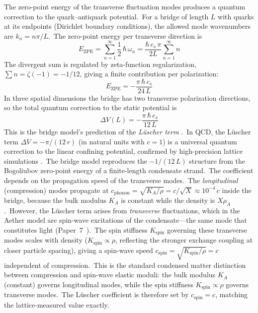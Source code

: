 ﻿\documentclass[12pt,letterpaper]{article}
\newcommand{\rhoa}{\rho_{\!A}}
\newcommand{\Ka}{K_{\!A}}
\begin{document}
The zero-point energy of the transverse fluctuation modes
produces a quantum correction to the quark--antiquark potential.\ For a
bridge of length $L$ with quarks at its endpoints (Dirichlet boundary
conditions), the allowed mode wavenumbers are
$k_n = n\pi / L$.\ The zero-point energy per transverse direction is
%
\begin{equation}
  E_{\mathrm{ZPE}} = \sum_{n=1}^{\infty} \frac{1}{2}\,\hbar\,\omega_n
    = \frac{\hbar\,c_s\,\pi}{2L} \sum_{n=1}^{\infty} n
\end{equation}
%
The divergent sum is regulated by zeta-function regularization,
$\sum n = \zeta(-1) = -1/12$, giving a finite contribution per
polarization:
%
\begin{equation}
  E_{\mathrm{ZPE}} = -\frac{\pi\,\hbar\,c_s}{24\,L}
\end{equation}
%
In three spatial dimensions the bridge has two transverse polarization
directions, so the total quantum correction to the static potential is
%
\begin{equation}
  \label{eq:luscher}
  \Delta V(L) = -\frac{\pi\,\hbar\,c_s}{12\,L}
\end{equation}
%
This is the bridge model's prediction of the \emph{L\"uscher term}
\cite{luscher1981,luscher2002}.\ In QCD, the L\"uscher term
$\Delta V = -\pi/(12\,r)$ (in natural units with $c = 1$) is a universal
quantum correction to the linear confining potential, confirmed by
high-precision lattice simulations \cite{juge2004}.\ The bridge model
reproduces the $-1/(12\,L)$ structure from the Bogoliubov
zero-point energy of a finite-length condensate strand.\ The coefficient
depends on the propagation speed of the transverse modes.\ The
\emph{longitudinal} (compression) modes propagate at
$c_{\mathrm{phonon}} = \sqrt{\Ka/\rho} = c/\sqrt{X} \approx 10^{-4}\,c$
inside the bridge, because the bulk modulus $\Ka$ is constant while the
density is $X\rhoa$.\ However, the L\"uscher term arises from
\emph{transverse} fluctuations, which in the Aether model are spin-wave
excitations of the condensate---the same mode that constitutes light
(Paper~7~\cite{otto-quantum}).\ The spin stiffness $K_{\mathrm{spin}}$
governing these transverse modes scales with density ($K_{\mathrm{spin}}
\propto \rho$, reflecting the stronger exchange coupling at closer
particle spacing), giving a spin-wave speed
$c_{\mathrm{spin}} = \sqrt{K_{\mathrm{spin}}/\rho} = c$ independent of
compression.\ This is the standard condensed matter distinction between
compression and spin-wave elastic moduli: the bulk modulus $\Ka$ (constant)
governs longitudinal modes, while the spin stiffness $K_{\mathrm{spin}}
\propto \rho$ governs transverse modes.\ The L\"uscher coefficient is
therefore set by $c_{\mathrm{spin}} = c$, matching the lattice-measured
value exactly.
\end{document}

